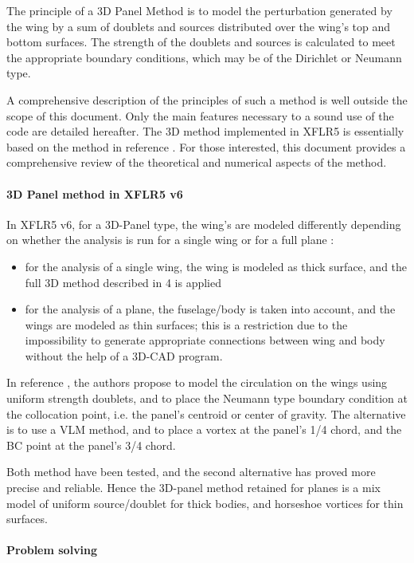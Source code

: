 \documentclass[a4paper,twoside,12pt,dvips]{article}
\begin{document}
The principle of a 3D Panel Method is to model the perturbation
generated by the wing by a sum of doublets and sources distributed
over the wing's top and bottom surfaces. The strength of the doublets
and sources is calculated to meet the appropriate boundary conditions,
which may be of the Dirichlet or Neumann type.

A comprehensive description of the principles of such a method is well
outside the scope of this document. Only the main features necessary
to a sound use of the code are detailed hereafter. The 3D method
implemented in XFLR5 is essentially based on the method in reference
\cite{Maskew}. For those interested, this document provides a
comprehensive review of the theoretical and numerical aspects of the
method.

\paragraph{3D Panel method in XFLR5 v6}

In XFLR5 v6, for a 3D-Panel type, the wing's are modeled differently
depending on whether the analysis is run for a single wing or for a
full plane :

\begin{itemize}
\item for the analysis of a single wing, the wing is modeled as thick
surface, and the full 3D method described in 4 is applied
\item for the analysis of a plane, the fuselage/body is taken into
account, and the wings are modeled as thin surfaces; this is a
restriction due to the impossibility to generate appropriate
connections between wing and body without the help of a 3D-CAD
program.
\end{itemize}

In reference \cite{Maskew}, the authors propose to model the
circulation on the wings using uniform strength doublets, and to place
the Neumann type boundary condition at the collocation point, i.e. the
panel's centroid or center of gravity. The alternative is to use a VLM
method, and to place a vortex at the panel's 1/4 chord, and the BC point
at the panel's 3/4 chord.

Both method have been tested, and the second alternative has proved
more precise and reliable. Hence the 3D-panel method retained for
planes is a mix model of uniform source/doublet for thick bodies, and
horseshoe vortices for thin surfaces.

\paragraph{Problem solving}
\end{document}
